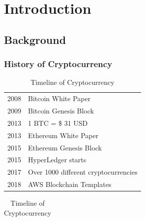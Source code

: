 \section{Introduction}

\subsection{Background}
\subsubsection[Overview]{History of Cryptocurrency}
\vspace*{-0.5cm}

\begin{minipage}[h]{0.45\linewidth}
\begin{warpprint}
\begin{table}[H]{}
\renewcommand\arraystretch{1.4}
\captionsetup{singlelinecheck=false, labelfont=sc, labelsep=quad}
\caption{Timeline of Cryptocurrency}%
\begin{tabular}{c p{5cm}}%
2008 & Bitcoin White Paper \\
2009 & Bitcoin Genesis Block\\
2013 & 1 BTC = \$ 31 USD\\
2013 & \gls{Ethereum} White Paper \\
2015 & \gls{Ethereum} Genesis Block\\
2015 & \gls{HyperLedger} starts \\
2017 & Over 1000 different cryptocurrencies \\
2018 & AWS Blockchain Templates \\
\end{tabular}
\end{table}
\end{warpprint}
\begin{warpHTML}
\begin{table}[H]{}
\renewcommand\arraystretch{1.4}
\caption{Timeline of Cryptocurrency}%
\begin{tabular}{c p{5cm}}%

\end{tabular}
\end{table}
\end{warpHTML}
\end{minipage}
